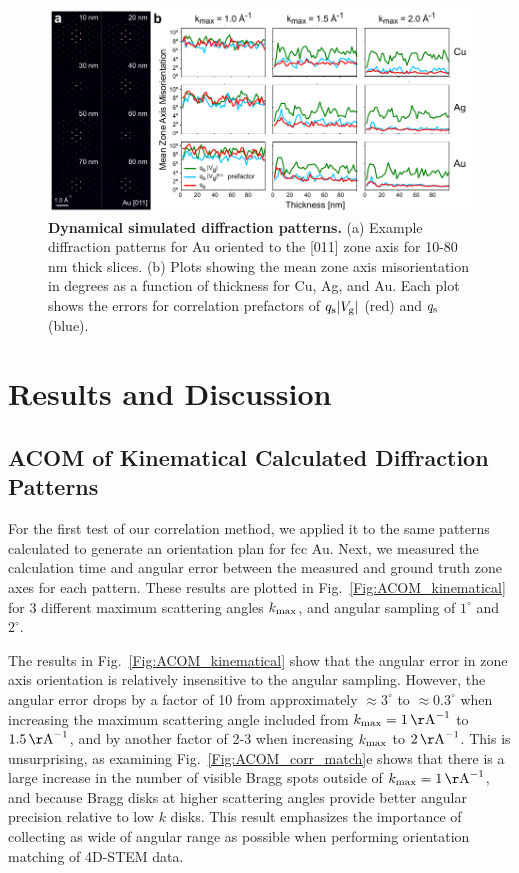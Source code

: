 \documentclass[%
 superscriptaddress,
 aip,
 amsmath,amssymb,
reprint,%
 author-year,%
longbibliography
]{revtex4-2}
\begin{document}
\begin{figure}[htbp]
    \centering
    \includegraphics[width=6.0 in]{figure_sim_03.pdf}
    \caption{{\bf Dynamical simulated diffraction patterns.} (a) Example diffraction patterns for Au oriented to the [011] zone axis for 10-80 nm thick slices. (b) Plots showing the mean zone axis misorientation in degrees as a function of thickness for Cu, Ag, and Au. Each plot shows the errors for correlation prefactors of $q_{\rm{s}} |V_{\rm{g}}|$ (red) and $q_{\rm{s}}$ (blue).}
    \label{Fig:dynamical_diffractions}
\end{figure}


\section*{Results and Discussion}

\subsection*{ACOM of Kinematical Calculated Diffraction Patterns}


For the first test of our correlation method, we applied it to the same patterns calculated to generate an orientation plan for fcc Au. Next, we measured the calculation time and angular error between the measured and ground truth zone axes for each pattern. These results are plotted in Fig.~\ref{Fig:ACOM_kinematical} for 3 different maximum scattering angles $k_{\rm{max}}$, and angular sampling of $1^\circ$ and $2^\circ$.

The results in Fig.~\ref{Fig:ACOM_kinematical} show that the angular error in zone axis orientation is relatively insensitive to the angular sampling. However, the angular error drops by a factor of 10 from approximately $\approx 3^\circ$ to $\approx 0.3^\circ$ when increasing the maximum scattering angle included from $k_{\rm{max}} = 1 \, {\rm{\AA}}^{-1}$ to $1.5 \, {\rm{\AA}}^{-1}$, and by another factor of 2-3 when increasing $k_{\rm{max}}$ to $2 \, {\rm{\AA}}^{-1}$. This is unsurprising, as examining Fig.~\ref{Fig:ACOM_corr_match}e shows that there is a large increase in the number of visible Bragg spots outside of $k_{\rm{max}} = 1 \, {\rm{\AA}}^{-1}$, and because Bragg disks at higher scattering angles provide better angular precision relative to low $k$ disks. This result emphasizes the importance of collecting as wide of angular range as possible when performing orientation matching of 4D-STEM data.
\end{document}
